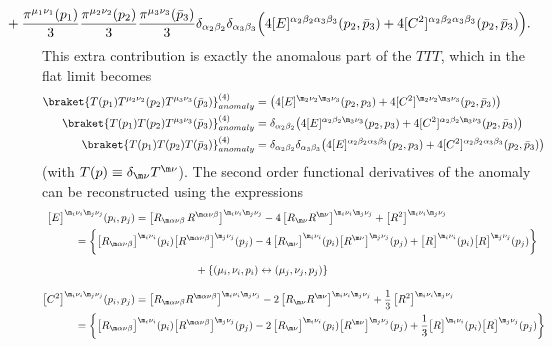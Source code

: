 \documentclass[a4paper,11pt,openright,twoside]{book}
\let\a=\alpha   \let\b=\beta   \let\g=\gamma   \let\d=\delta
\let\n=\nu      \let\x=\xi     \let\p=\pi      \let\r=\rho
\newcommand{\sdfrac}[2]{\mbox{\small$\displaystyle\frac{#1}{#2}$}}
\numberwithin{equation}{section}
\begin{document}
{{\begin{align}
	&\hspace{-1cm}+\frac{\p^{\mu_1\nu_1}(p_1)}{3}\frac{\p^{\mu_2\nu_2}(p_2)}{3}\frac{\p^{\mu_3\nu_3}(\bar{p}_3)}{3}\d_{\a_2\b_2}\d_{\a_3\b_3}\Big(4[E]^{\a_2\b_2\a_3\b_3}(p_2,\bar{p}_3)+4[C^2]^{\a_2\b_2\a_3\b_3}(p_2,\bar{p}_3)\Big).
\end{align}
This extra contribution is exactly the anomalous part of the $TTT$, which in the flat limit becomes
\begin{align}
	\braket{T(p_1)T^{\mu_2\nu_2}(p_2)T^{\mu_3\nu_3}(\bar{p}_3)}_{anomaly}^{(4)}&=\big(4[E]^{\m_2\n_2\m_3\n_3}(p_2,p_3)+4[C^2]^{\m_2\n_2\m_3\n_3}(p_2,\bar{p}_3)\big)\\
	\braket{T(p_1)T(p_2)T^{\mu_3\nu_3}(\bar{p}_3)}_{anomaly}^{(4)}&=\d_{\a_2\b_2}\big(4[E]^{\a_2\b_2\m_3\n_3}(p_2,p_3)+4[C^2]^{\a_2\b_2\m_3\n_3}(p_2,\bar{p}_3)\big)\notag\\
	\braket{T(p_1)T(p_2)T(\bar{p}_3)}_{anomaly}^{(4)}&=\d_{\a_2\b_2}\d_{\a_3\b_3}\big(4[E]^{\a_2\b_2\a_3\b_3}(p_2,p_3)+4[C^2]^{\a_2\b_2\a_3\b_3}(p_2,\bar{p}_3)\big)
\end{align}
(with $T(p)\equiv \delta_{\m\n}T^{\m\nu}$).
The second order functional derivatives of the anomaly can be reconstructed using the expressions 
\begin{align}
	\big[E\big]^{\m_i\nu_i\m_j\nu_j}(p_i,p_j) &=\big[R_{\m\a\n\b}\,R^{\m\a \n\b}\big]^{\m_i\nu_i\m_j\nu_j}
	-4\,\big[R_{\m\n}R^{\m\n}\big]^{\m_i\nu_i\m_j\nu_j}
	+\big[ R^2\big]^{\m_i\nu_i\m_j\nu_j}\notag\\
	&\hspace{-2cm}=\bigg\{\big[R_{\m\a\n\b}\big]^{\m_i\nu_i}(p_i)\big[R^{\m\a \n\b}\big]^{\m_j\nu_j}(p_j)
	-4\,\big[R_{\m\n}\big]^{\m_i\nu_i}(p_i)\big[R^{\m\n}\big]^{\m_j\nu_j}(p_j)
	+\big[ R\big]^{\m_i\nu_i}(p_i)\big[R\big]^{\m_j\nu_j}(p_j)\bigg\}\notag\\[1.2ex]
	&\hspace{2cm}+\{(\mu_i,\nu_i,p_i)\leftrightarrow (\mu_j,\nu_j,p_j)\}\\[2ex]
	\big[C^2\big]^{\m_i\nu_i\m_j\nu_j}(p_i,p_j) &= \big[R_{\m\a\n\b}R^{\m\a \n\b}\big]^{\m_i\nu_i\m_j\nu_j}
	-2\,\big[R_{\m\n}R^{\m\n}\big]^{\m_i\nu_i\m_j\nu_j}
	+ \sdfrac{1}{3}\,\big[R^2\big]^{\m_i\nu_i\m_j\nu_j}\notag\\
	&\hspace{-2cm}=\bigg\{\big[R_{\m\a\n\b}\big]^{\m_i\nu_i}(p_i)\big[R^{\m\a \n\b}\big]^{\m_j\nu_j}(p_j)
	-2\,\big[R_{\m\n}\big]^{\m_i\nu_i}(p_i)\big[R^{\m\n}\big]^{\m_j\nu_j}(p_j)
	+\frac{1}{3}\big[ R\big]^{\m_i\nu_i}(p_i)\big[R\big]^{\m_j\nu_j}(p_j)\bigg\}\notag\\[1.2ex]

\end{align}}}
\end{document}
